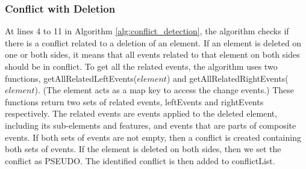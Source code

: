 \subsubsection{Conflict with Deletion}
\label{sec:delete_conflict}
At lines 4 to 11 in Algorithm \ref{alg:conflict_detection}, the algorithm checks if there is a conflict related to a deletion of an element.
If an element is deleted on one or both sides, it means that all events related to that element on both sides should be in conflict.
To get all the related events, the algorithm uses two functions, \textsf{getAllRelatedLeftEvents($element$)} and \textsf{getAllRelatedRightEvents($element$)}. (The element acts as a map key to access the change events.) These functions return two sets of related events,
\textsf{leftEvents} and \textsf{rightEvents} respectively. The related events are events applied to the deleted element, including its sub-elements and features,
and events that are parts of composite events. If both sets of events are not empty, then a conflict is created containing both sets of events.
If the element is deleted on both sides, then we set the conflict as \textsf{PSEUDO}. The identified conflict is then added to \textsf{conflictList}.

